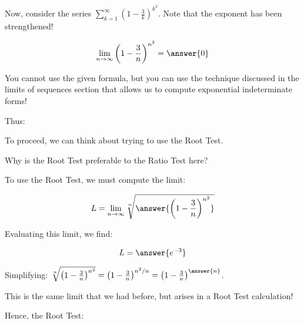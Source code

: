 \documentclass{ximera}
\begin{document}
\begin{exercise}
Now, consider the series $\sum_{k=1}^{\infty} \left(1-\frac{3}{k}\right)^{k^2}$.  Note that the exponent has been strengthened!
 
 \begin{exercise}
\[
\lim_{n \to \infty} \left(1-\frac{3}{n}\right)^{n^2} = \answer{0}
\]

\begin{hint}
You cannot use the given formula, but you can use the technique discussed in the limits of sequences section that allows us to compute exponential indeterminate forms!
\end{hint}
 
 Thus:
 \begin{multipleChoice}
\end{multipleChoice}

To proceed, we can think about trying to use the Root Test.
\begin{multipleChoice}
\end{multipleChoice}

Why is the Root Test preferable to the Ratio Test here?
\begin{multipleChoice}
\end{multipleChoice}

To use the Root Test, we must compute the limit:

\[
L = \lim_{n \to \infty} \sqrt[n]{\answer{ \left(1-\frac{3}{n}\right)^{n^2}}} 
\]

Evaluating this limit, we find:

\[
L = \answer{e^{-3}}
\]

\begin{hint}
Simplifying: $ \sqrt[n]{\left(1-\frac{3}{n}\right)^{n^2}} = \left(1-\frac{3}{n}\right)^{n^2/n} = \left(1-\frac{3}{n}\right)^{\answer{n}} $.  

This is the same limit that we had before, but arises in a Root Test calculation!
\end{hint}

Hence, the Root Test:
\begin{multipleChoice}
\end{multipleChoice}

\end{exercise}
\end{exercise}
\end{document}
